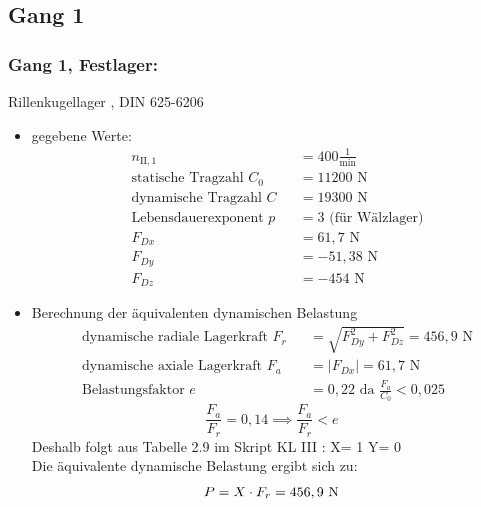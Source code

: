 \subsection{Gang 1}
\subsubsection{Gang 1, Festlager:} Rillenkugellager , DIN 625-6206\\
\begin{itemize}
	\item gegebene Werte:
	\begin{align*}
	&n_{{\mathord{\mathrm{II}},1}} &&=  400 \frac{1}{\text{min}} \\
	&\text{statische Tragzahl } C_{0} &&= 11200 \text{ N}\\
	&\text{dynamische Tragzahl } C &&= 19300 \text{ N} \\
	&\text{Lebensdauerexponent } p &&= 3 \text{ (für Wälzlager)} \\
	&F_{Dx} && = 61,7 \text{ N}\\
	&F_{Dy} && = -51,38 \text{ N}\\
	&F_{Dz} && = -454 \text{ N}
	\end{align*} 
	\item Berechnung der äquivalenten dynamischen Belastung
	\begin{align*}
	&\text{dynamische radiale Lagerkraft } F_r&& = \sqrt{F_{Dy}^2 + F_{Dz}^2 } = 456,9 \text{ N} \\
	&\text{dynamische axiale Lagerkraft } F_a&& = |F_{Dx}| = 61,7 \text{ N}\\
	&\text{Belastungsfaktor } e &&= 0,22 \text{ da } \frac{F_a}{C_0} < 0,025
	\end{align*} 
	\[\frac{F_a}{F_r} = 0,14 \implies \frac{F_a}{F_r} < e\]
	Deshalb folgt aus Tabelle 2.9 im Skript KL III : X= 1 \text{, } Y= 0 \\
	Die äquivalente dynamische Belastung ergibt sich zu: 
	\[
	P= X \cdot F_r = 456,9 \text{ N}
	\]
\end{itemize}

